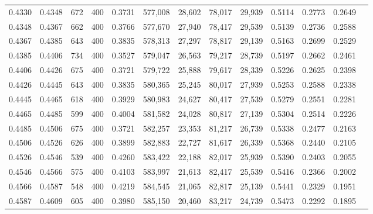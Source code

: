 \begin{tabular}{rrrrrrrrrrrrr}
0.4330 & 0.4348 &    672 &   400 &                                     0.3731 & 577,008 &  28,602 &  78,017 &  29,939 & 0.5114 & 0.2773 & 0.2649 \\
0.4348 & 0.4367 &    662 &   400 &                                     0.3766 & 577,670 &  27,940 &  78,417 &  29,539 & 0.5139 & 0.2736 & 0.2588 \\
0.4367 & 0.4385 &    643 &   400 &                                     0.3835 & 578,313 &  27,297 &  78,817 &  29,139 & 0.5163 & 0.2699 & 0.2529 \\
0.4385 & 0.4406 &    734 &   400 &                                     0.3527 & 579,047 &  26,563 &  79,217 &  28,739 & 0.5197 & 0.2662 & 0.2461 \\
0.4406 & 0.4426 &    675 &   400 &                                     0.3721 & 579,722 &  25,888 &  79,617 &  28,339 & 0.5226 & 0.2625 & 0.2398 \\
0.4426 & 0.4445 &    643 &   400 &                                     0.3835 & 580,365 &  25,245 &  80,017 &  27,939 & 0.5253 & 0.2588 & 0.2338 \\
0.4445 & 0.4465 &    618 &   400 &                                     0.3929 & 580,983 &  24,627 &  80,417 &  27,539 & 0.5279 & 0.2551 & 0.2281 \\
0.4465 & 0.4485 &    599 &   400 &                                     0.4004 & 581,582 &  24,028 &  80,817 &  27,139 & 0.5304 & 0.2514 & 0.2226 \\
0.4485 & 0.4506 &    675 &   400 &                                     0.3721 & 582,257 &  23,353 &  81,217 &  26,739 & 0.5338 & 0.2477 & 0.2163 \\
0.4506 & 0.4526 &    626 &   400 &                                     0.3899 & 582,883 &  22,727 &  81,617 &  26,339 & 0.5368 & 0.2440 & 0.2105 \\
0.4526 & 0.4546 &    539 &   400 &                                     0.4260 & 583,422 &  22,188 &  82,017 &  25,939 & 0.5390 & 0.2403 & 0.2055 \\
0.4546 & 0.4566 &    575 &   400 &                                     0.4103 & 583,997 &  21,613 &  82,417 &  25,539 & 0.5416 & 0.2366 & 0.2002 \\
0.4566 & 0.4587 &    548 &   400 &                                     0.4219 & 584,545 &  21,065 &  82,817 &  25,139 & 0.5441 & 0.2329 & 0.1951 \\
0.4587 & 0.4609 &    605 &   400 &                                     0.3980 & 585,150 &  20,460 &  83,217 &  24,739 & 0.5473 & 0.2292 & 0.1895 \\

\end{tabular}
